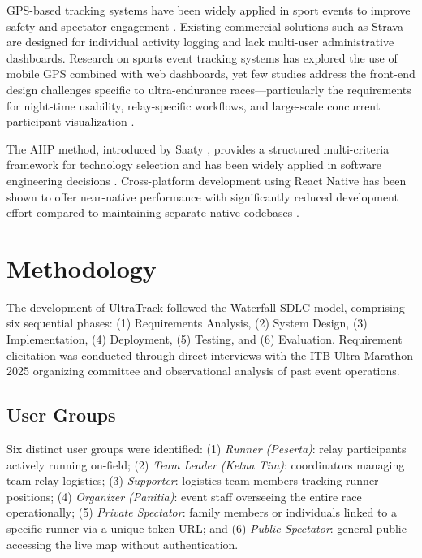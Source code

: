 \documentclass[conference]{IEEEtran}
\begin{document}
GPS-based tracking systems have been widely applied in sport events to improve safety and spectator engagement \cite{Hochreiter2024}. Existing commercial solutions such as Strava are designed for individual activity logging and lack multi-user administrative dashboards. Research on sports event tracking systems has explored the use of mobile GPS combined with web dashboards, yet few studies address the front-end design challenges specific to ultra-endurance races---particularly the requirements for night-time usability, relay-specific workflows, and large-scale concurrent participant visualization \cite{higgins2016smartphone}.

The AHP method, introduced by Saaty \cite{Saaty1980}, provides a structured multi-criteria framework for technology selection and has been widely applied in software engineering decisions \cite{Vaidya2006}. Cross-platform development using React Native has been shown to offer near-native performance with significantly reduced development effort compared to maintaining separate native codebases \cite{Nawrocki2021}.

\section{Methodology}

The development of UltraTrack followed the Waterfall SDLC model, comprising six sequential phases: (1) Requirements Analysis, (2) System Design, (3) Implementation, (4) Deployment, (5) Testing, and (6) Evaluation. Requirement elicitation was conducted through direct interviews with the ITB Ultra-Marathon 2025 organizing committee and observational analysis of past event operations.

\subsection{User Groups}
Six distinct user groups were identified: (1) \textit{Runner (Peserta)}: relay participants actively running on-field; (2) \textit{Team Leader (Ketua Tim)}: coordinators managing team relay logistics; (3) \textit{Supporter}: logistics team members tracking runner positions; (4) \textit{Organizer (Panitia)}: event staff overseeing the entire race operationally; (5) \textit{Private Spectator}: family members or individuals linked to a specific runner via a unique token URL; and (6) \textit{Public Spectator}: general public accessing the live map without authentication.
\end{document}
